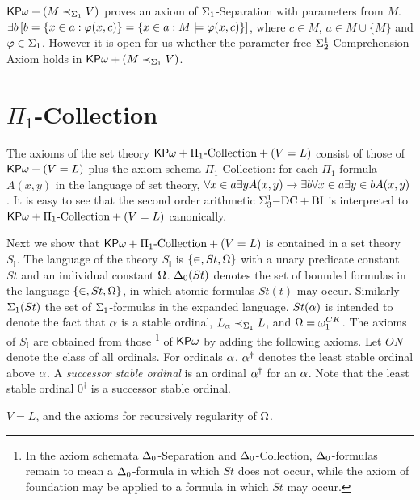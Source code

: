 \documentclass{article}
\newcommand{\mI}{\mathbb{I}}
\begin{document}
${\sf KP}\omega+(M\prec_{\Sigma_{1}}V)$ proves an axiom of
$\Sigma_{1}$-Separation with parameters from $M$.
$\exists b\left[b=\{x\in a: \varphi(x,c)\}=\{x\in a: M\models\varphi(x,c)\}\right]$, where
$c\in M$, $a\in M\cup\{M\}$ and $\varphi\in\Sigma_{1}$.
However it is open for us whether the parameter-free $\Sigma^{1}_{2}$-Comprehension Axiom
holds in ${\sf KP}\omega+(M\prec_{\Sigma_{1}}V)$.


\section{$\Pi_{1}$-Collection}\label{sec:pi1collection}


The axioms of the set theory ${\sf KP}\omega+\Pi_{1}\mbox{-Collection}+(V=L)$ consist of those of 
${\sf KP}\omega+(V=L)$ plus the axiom schema $\Pi_{1}\mbox{-Collection}$:
for each $\Pi_{1}$-formula $A(x,y)$ in the language of set theory, 
$\forall x\in a\exists yA(x,y)\to \exists b\forall x\in a\exists y\in b A(x,y)$.
It is easy to see that the second order arithmetic
$\Sigma^{1}_{3}{\rm -DC+BI}$ is interpreted to
${\sf KP}\omega+\Pi_{1}\mbox{{\rm -Collection}}+(V=L)$ canonically.

Next we show that ${\sf KP}\omega+\Pi_{1}\mbox{-Collection}+(V=L)$ is contained in a set theory 
$S_{\mI}$.
The language of the theory $S_{\mI}$ is $\{\in,St,\Omega\}$ with a unary predicate constant $St$
and an individual constant $\Omega$.
$\Delta_{0}(St)$ denotes the set of bounded formulas in the language $\{\in,St,\Omega\}$,
in which atomic formulas $St(t)$ may occur.
Similarly
$\Sigma_{1}(St)$ the set of $\Sigma_{1}$-formulas in the expanded language.
$St(\alpha)$ is intended to denote the fact that $\alpha$ is a stable ordinal, $L_{\alpha}\prec_{\Sigma_{1}}L$,
and $\Omega=\omega_{1}^{CK}$.
The axioms of $S_{\mI}$ are obtained from those
\footnote{In the axiom schemata $\Delta_{0}$-Separation and $\Delta_{0}$-Collection,
 $\Delta_{0}$-formulas remain to mean a $\Delta_{0}$-formula in which $St$ does not occur, 
 while the axiom of foundation may be applied to a formula in which $St$ may occur.} of ${\sf KP}\omega$ by adding the following axioms.
Let $ON$ denote the class of all ordinals.
For ordinals $\alpha$, 
$\alpha^{\dagger}$ denotes the least stable ordinal above $\alpha$.
A \textit{successor stable ordinal} is an ordinal $\alpha^{\dagger}$ for an $\alpha$.
Note that the least stable ordinal $0^{\dagger}$ is a successor stable ordinal.




\benu
\item
$V=L$, and
the axioms for recursively regularity of $\Omega$.
\end{document}

